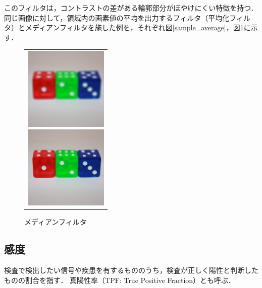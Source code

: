 \documentclass[openright]{nitocs}
\numberwithin{equation}{section}
\begin{document}
            このフィルタは，コントラストの差がある輪郭部分がぼやけにくい特徴を持つ．
            同じ画像に対して，領域内の画素値の平均を出力するフィルタ（平均化フィルタ）とメディアンフィルタを施した例を，それぞれ図\ref{sample_average}，図\ref{sample_median}に示す．
            \begin{figure}[tb] %
                \begin{center}
                  \begin{tabular}{c}
                    \begin{minipage}{0.5\hsize}
                      \begin{center}
                        \includegraphics[clip,width=40mm]{sample_average.jpg}
                    \caption{平均化フィルタ}
                    \label{sample_average}
                      \end{center}
                    \end{minipage}
                    \begin{minipage}{0.5\hsize}
                      \begin{center}
                        \includegraphics[clip,width=40mm]{sample_median.jpg}
                    \caption{メディアンフィルタ}
                    \label{sample_median}
                      \end{center}
                    \end{minipage}
                  \end{tabular}
                \end{center}
            \end{figure}

        \subsection{感度} %
        検査で検出したい信号や疾患を有するもののうち，検査が正しく陽性と判断したものの割合を指す．
        真陽性率（TPF: True Positive Fraction）とも呼ぶ．
\end{document}

